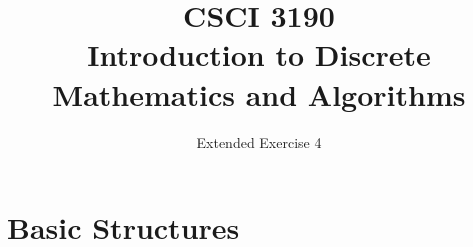 \documentclass{sig-alternate-05-2015}
\begin{document}






%

\title{CSCI 3190 \\ Introduction to Discrete Mathematics and Algorithms}
\subtitle{Extended Exercise 4}

\maketitle
\begin{abstract}

\end{abstract}

\keywords{}

\section{Basic Structures}
\end{document}
